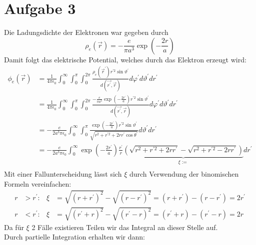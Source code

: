 \documentclass{article}
\newcommand{\epsz}{\epsilon_0}
\begin{document}
\newpage
\section*{Aufgabe 3}
Die Ladungsdichte der Elektronen war gegeben durch
\[
	\rho_e(\vec r) = - \frac{e}{\pi a^3} \exp\left(-\frac{2r}{a} \right)
\]
Damit folgt das elektrische Potential, welches durch das Elektron erzeugt
wird:
\begin{align*}
	\phi_e\left( \vec r \right)
	&= \frac 1 {4\pi\epsz}
	\int_0^\infty \int_0^\pi \int_0^{2\pi}
	\frac{\rho_e(\vec r^\prime) r^{\prime 2} \sin\vartheta^\prime}
	{d \left(\vec{r^\prime}, \vec r \right) }
	d\varphi^\prime d\vartheta^\prime dr^\prime \\
	&= \frac 1 {4\pi\epsz}
	\int_0^\infty \int_0^\pi \int_0^{2\pi}
	\frac{
	- \frac{e}{\pi a^3} \exp\left(-\frac{2r^\prime}{a} \right)
	r^{\prime 2} \sin\vartheta^\prime}
	{d \left(\vec{r^\prime}, \vec r \right) }
	d\varphi^\prime d\vartheta^\prime dr^\prime \\
	&= - \frac e {2 a^3 \pi\epsz}
	\int_0^\infty \int_0^\pi
	\frac{
	 \exp\left(-\frac{2r^\prime}{a} \right)
	r^{\prime 2} \sin\vartheta^\prime}
	{\sqrt{r^2 + r^{\prime 2} + 2r r^\prime \cos\theta^\prime}}
	d\vartheta^\prime dr^\prime \\
	&= - \frac e {2 a^3 \pi\epsz}
	\int_0^\infty
	\exp\left(-\frac{2r^\prime}{a} \right)
	\frac{r^\prime}{r} \underbrace{ \left(
	\sqrt{r^2 + r^{\prime 2} + 2r r^\prime} -
	\sqrt{r^2 + r^{\prime 2} - 2r r^\prime} \right)}_{
		\xi :=}
	dr^\prime \\
\end{align*}
Mit einer Fallunterscheidung lässt sich $\xi$ durch Verwendung der
binomischen Formeln vereinfachen:
\begin{align*}
	r &> r^\prime: &
	\xi &= \sqrt{(r + r^\prime)^2} - \sqrt{(r - r^\prime)^2}
	= (r + r^\prime) - (r - r^\prime) = 2r^\prime \\
	r &< r^\prime: &
	\xi  &= \sqrt{(r^\prime + r)^2} - \sqrt{(r^\prime - r)^2}
	= (r^\prime + r) - (r^\prime - r) = 2r
\end{align*}
Da für $\xi$ 2 Fälle existieren Teilen wir das Integral an dieser Stelle
auf.\\
Durch partielle Integration erhalten wir dann:
\end{document}
